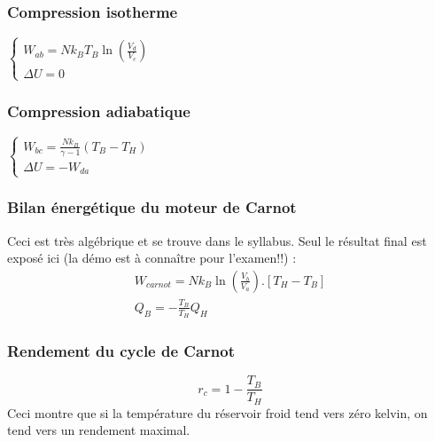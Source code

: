 \documentclass	[11pt, a4paper, openany]{book}
\begin{document}
\subsubsection{Compression isotherme}
$\left\{\begin{array}{l}
W_{ab} = Nk_BT_B\ln\left(\frac{V_d}{V_c}\right)\\
\Delta U = 0
\end{array}\right.$

\subsubsection{Compression adiabatique}
$\left\{\begin{array}{l}
W_{bc} = \frac{Nk_B}{\gamma - 1}(T_B - T_H)\\
\Delta U = - W_{da}
\end{array}\right.$

\subsubsection{Bilan énergétique du moteur de Carnot}
Ceci est très algébrique et se trouve dans le syllabus. Seul le résultat final est exposé ici (la démo est à connaître pour l'examen!!) :
\begin{eqnarray}
W_{carnot} = Nk_B\ln\left(\frac{V_b}{V_a}\right).\left[T_H - T_B\right]\\
Q_B = -\frac{T_B}{T_H}Q_H
\end{eqnarray}


\subsubsection{Rendement du cycle de Carnot}
\begin{equation}
r_c = 1 - \frac{T_B}{T_H}
\end{equation}
Ceci montre que si la température du réservoir froid tend vers zéro kelvin, on tend vers un rendement maximal.
\end{document}
